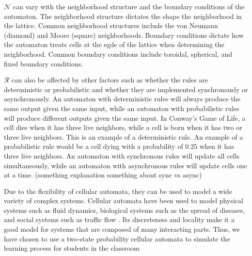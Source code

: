 


$\mathcal{N}$ can vary with the neighborhood structure and the boundary conditions of the automaton. The neighborhood structure dictates the shape the neighborhood in the lattice. Common neighborhood structures include the von Neumann (diamond) and Moore (square) neighborhoods. Boundary conditions dictate how the automaton treats cells at the egde of the lattice when determining the neighborhood. Common boundary conditions include toroidal, spherical, and fixed boundary conditions. 

$\mathcal{R}$ can also be affected by other factors such as whether the rules are deterministic or probabilistic and whether they are implemented synchronously or asynchronously. An automaton with deterministic rules will always produce the same output given the same input, while an automaton with probabilistic rules will produce different outputs given the same input. In Conway's Game of Life, a cell dies when it has three live neighbors, while a cell is born when it has two or three live neighbors. This is an example of a deterministic rule. An example of a probabilistic rule would be a cell dying with a probability of $0.25$ when it has three live neighbors. An automaton with synchronous rules will update all cells simultaneously, while an automaton with asynchronous rules will update cells one at a time. (something explanation something about sync vs async)


Due to the flexibility of cellular automata, they can be used to model a wide variety of complex systems. Cellular automata have been used to model physical systems such as fluid dynamics, biological systems such as the spread of diseases, and social systems such as traffic flow \cite{louis2018probabilistic}. Its discreteness and locality make it a good model for systems that are composed of many interacting parts. Thus, we have chosen to use a two-state probability cellular automata to simulate the learning process for students in the classroom


